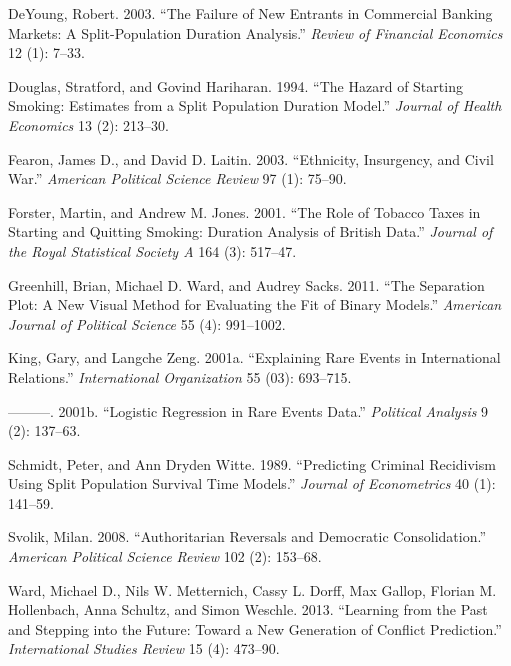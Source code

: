 \documentclass[article]{jss}
\begin{document}
\hypertarget{ref-deyoung2003failure}{}
DeYoung, Robert. 2003. ``The Failure of New Entrants in Commercial
Banking Markets: A Split-Population Duration Analysis.'' \emph{Review of
Financial Economics} 12 (1): 7--33.

\hypertarget{ref-douglas1994hazard}{}
Douglas, Stratford, and Govind Hariharan. 1994. ``The Hazard of Starting
Smoking: Estimates from a Split Population Duration Model.''
\emph{Journal of Health Economics} 13 (2): 213--30.

\hypertarget{ref-fearon2003ethnicity}{}
Fearon, James D., and David D. Laitin. 2003. ``Ethnicity, Insurgency,
and Civil War.'' \emph{American Political Science Review} 97 (1):
75--90.

\hypertarget{ref-forster2001role}{}
Forster, Martin, and Andrew M. Jones. 2001. ``The Role of Tobacco Taxes
in Starting and Quitting Smoking: Duration Analysis of British Data.''
\emph{Journal of the Royal Statistical Society A} 164 (3): 517--47.

\hypertarget{ref-greenhill2011separation}{}
Greenhill, Brian, Michael D. Ward, and Audrey Sacks. 2011. ``The
Separation Plot: A New Visual Method for Evaluating the Fit of Binary
Models.'' \emph{American Journal of Political Science} 55 (4):
991--1002.

\hypertarget{ref-king2001explaining}{}
King, Gary, and Langche Zeng. 2001a. ``Explaining Rare Events in
International Relations.'' \emph{International Organization} 55 (03):
693--715.

\hypertarget{ref-king2001logistic}{}
---------. 2001b. ``Logistic Regression in Rare Events Data.''
\emph{Political Analysis} 9 (2): 137--63.

\hypertarget{ref-schmidt1989predicting}{}
Schmidt, Peter, and Ann Dryden Witte. 1989. ``Predicting Criminal
Recidivism Using Split Population Survival Time Models.'' \emph{Journal
of Econometrics} 40 (1): 141--59.

\hypertarget{ref-svolik2008authoritarian}{}
Svolik, Milan. 2008. ``Authoritarian Reversals and Democratic
Consolidation.'' \emph{American Political Science Review} 102 (2):
153--68.

\hypertarget{ref-ward2013learning}{}
Ward, Michael D., Nils W. Metternich, Cassy L. Dorff, Max Gallop,
Florian M. Hollenbach, Anna Schultz, and Simon Weschle. 2013. ``Learning
from the Past and Stepping into the Future: Toward a New Generation of
Conflict Prediction.'' \emph{International Studies Review} 15 (4):
473--90.
\end{document}
